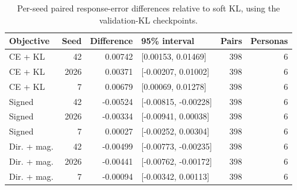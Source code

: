 \begin{table}[pos=htbp]
\centering\footnotesize
\caption{Per-seed paired response-error differences relative to soft KL, using the validation-KL checkpoints.}
\label{tab:response_seed_differences}
\setlength{\tabcolsep}{3pt}
\renewcommand{\arraystretch}{1.12}
\begin{tabular}{@{}lrrlrr@{}}
\toprule
Objective & Seed & Difference & 95\% interval & Pairs & Personas \\
\midrule
CE + KL & 42 & 0.00742 & [0.00153, 0.01469] & 398 & 6 \\
CE + KL & 2026 & 0.00371 & [-0.00207, 0.01002] & 398 & 6 \\
CE + KL & 7 & 0.00679 & [0.00069, 0.01278] & 398 & 6 \\
Signed & 42 & -0.00524 & [-0.00815, -0.00228] & 398 & 6 \\
Signed & 2026 & -0.00334 & [-0.00941, 0.00038] & 398 & 6 \\
Signed & 7 & 0.00027 & [-0.00252, 0.00304] & 398 & 6 \\
Dir. + mag. & 42 & -0.00499 & [-0.00773, -0.00235] & 398 & 6 \\
Dir. + mag. & 2026 & -0.00441 & [-0.00762, -0.00172] & 398 & 6 \\
Dir. + mag. & 7 & -0.00094 & [-0.00342, 0.00113] & 398 & 6 \\
\bottomrule
\end{tabular}
\par{}
\end{table}

